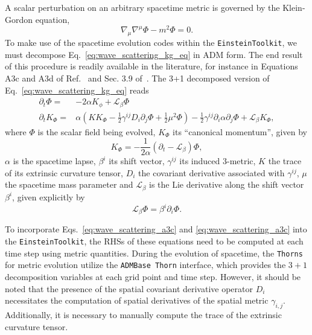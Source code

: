 A scalar perturbation on an arbitrary spacetime metric is governed by the Klein-Gordon equation,
%
\begin{equation}
  \nabla_\mu \nabla^\mu \Phi - m^2 \Phi = 0.
  \label{eq:wave_scattering_kg_eq}
\end{equation}
%
To make use of the spacetime evolution codes within the \texttt{EinsteinToolkit}, we must decompose Eq.~\eqref{eq:wave_scattering_kg_eq} in \ac{ADM} form. The end result of this procedure is readily available in the literature, for instance in Equations A3c and A3d of Ref.~\cite{PhysRevD.96.104040} and Sec. 3.9 of~\cite{Ficarra2023}. The 3+1 decomposed version of Eq.~\eqref{eq:wave_scattering_kg_eq} reads
%
\begin{align}
  \partial_t \Phi =   & -2 \alpha K_\phi + \mathcal{L}_\beta \Phi \label{eq:wave_scattering_a3c}                                                                                                                                                     \\
  \partial_t K_\Phi = & \alpha \left( K K_\Phi - \frac{1}{2} \gamma^{ij} D_i \partial_j \Phi + \frac{1}{2} \mu^2 \Phi \right) - \frac{1}{2} \gamma^{ij} \partial_i \alpha \partial_j \Phi + \mathcal{L}_\beta K_\Phi, \label{eq:wave_scattering_a3d}
\end{align}
%
where $\Phi$ is the scalar field being evolved, $K_\Phi$ its ``canonical momentum'', given by
%
\begin{equation}
  K_\Phi = -\frac{1}{2\alpha} \left( \partial_t - \mathcal{L}_\beta \right)\Phi,
  \label{eq:wave_scattering_a2}
\end{equation}
%
$\alpha$ is the spacetime lapse, $\beta^i$ its shift vector, $\gamma^{ij}$ its induced 3-metric, $K$ the trace of its extrinsic curvature tensor, $D_i$ the covariant derivative associated with $\gamma^{ij}$, $\mu$ the spacetime mass parameter and $\mathcal{L}_\beta$ is the Lie derivative along the shift vector $\beta^i$, given explicitly by
%
\begin{equation}
  \mathcal{L}_\beta\Phi = \beta^i \partial_i \Phi.
  \label{eq:wave_scattering_lie_derivative}
\end{equation}

To incorporate Eqs.~\eqref{eq:wave_scattering_a3c} and \eqref{eq:wave_scattering_a3c} into the \texttt{EinsteinToolkit}, the RHSs of these equations need to be computed at each time step using metric quantities. During the evolution of spacetime, the \texttt{Thorns} for metric evolution utilize the \texttt{ADMBase Thorn} interface, which provides the $3+1$ decomposition variables at each grid point and time step. However, it should be noted that the presence of the spatial covariant derivative operator $D_i$ necessitates the computation of spatial derivatives of the spatial metric $\gamma_{i,j}$. Additionally, it is necessary to manually compute the trace of the extrinsic curvature tensor.

